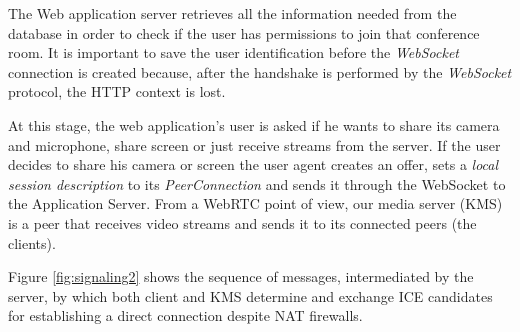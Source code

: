 \documentclass[10pt,conference]{IEEEtran}
\begin{document}
The Web application server retrieves all the information needed from the database in order to check if the user has permissions to join that conference room. 
It is important to save the user identification before the \emph{WebSocket} connection is created because, after the handshake is performed by the \emph{WebSocket} protocol\cite{rfc6455}, the \gls{HTTP} context is lost.

At this stage, the web application's user is asked if he wants to share its camera and microphone, share screen or just receive streams from the server. 
If the user decides to share his camera or screen the user agent creates an offer, sets a \emph{local session description} to its \emph{PeerConnection} and sends it through the WebSocket to the Application Server.
From a \gls{WebRTC} point of view, our media server (\gls{KMS}) is a peer that receives video streams and sends it to its connected peers (the clients). 

Figure \ref{fig:signaling2} shows the sequence of messages, intermediated by the server, by which both client and \gls{KMS} determine and exchange \gls{ICE} candidates for establishing a direct connection despite \gls{NAT} firewalls.



\end{document}
